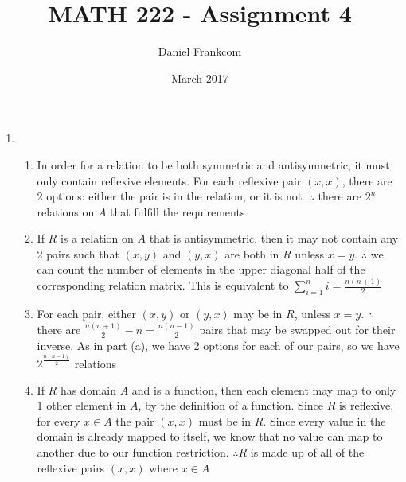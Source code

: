 \documentclass{article}
\title{MATH 222 - Assignment 4}
\date{March 2017}
\author{Daniel Frankcom}
\begin{document}
	\maketitle
	\setlength{\parindent}{0pt}
	\newcommand{\forceindent}{\leavevmode{\parindent=72pt\indent}}
	\newpage
	
	\begin{enumerate}
		
		\item 
		\begin{enumerate}
			\item In order for a relation to be both symmetric and antisymmetric, it must only contain reflexive elements. For each reflexive pair $(x,x)$, there are 2 options: either the pair is in the relation, or it is not.
			\newline $\therefore$ there are $2^n$ relations on $A$ that fulfill the requirements
			\item If $R$ is a relation on $A$ that is antisymmetric, then it may not contain any 2 pairs such that $(x,y)$ and $(y,x)$ are both in $R$ unless $x=y$.
			\newline $\therefore$ we can count the number of elements in the upper diagonal half of the corresponding relation matrix.
			\newline This is equivalent to $\sum\limits_{i=1}^{n}i=\frac{n(n+1)}{2}$
			\item For each pair, either $(x,y)$ or $(y,x)$ may be in $R$, unless $x=y$.
			\newline $\therefore$ there are $\frac{n(n+1)}{2}-n=\frac{n(n-1)}{2}$ pairs that may be swapped out for their inverse.
			\newline As in part (a), we have 2 options for each of our pairs, so we have $2^\frac{n(n-1)}{2}$ relations
			\item If $R$ has domain $A$ and is a function, then each element may map to only 1 other element in $A$, by the definition of a function. 
			\newline Since $R$ is reflexive, for every $x\in A$ the pair $(x,x)$ must be in $R$.
			\newline Since every value in the domain is already mapped to itself, we know that no value can map to another due to our function restriction.
			\newline $\therefore R$ is made up of all of the reflexive pairs $(x,x)$ where $x\in A$
		\end{enumerate}
	

\end{enumerate}
\end{document}
